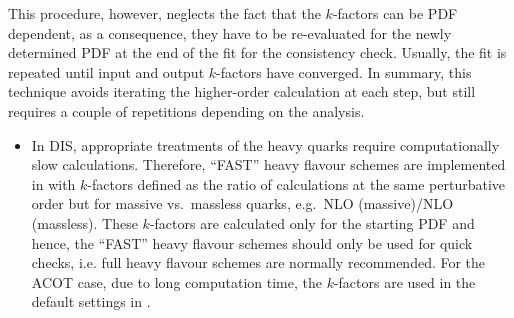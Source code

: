   This procedure, however, neglects the fact that the $k$-factors can be 
  PDF dependent, 
  as a consequence, they have to be re-evaluated
  for the newly determined PDF at the end of the fit for the consistency
  check. Usually, the fit is repeated until input and output
  $k$-factors have converged. In summary, this technique avoids
  iterating the higher-order calculation at each step, but still
  requires a couple of repetitions depending on the analysis.


\begin{itemize}
%
  \item In DIS, appropriate treatments of the heavy quarks require  
    computationally slow calculations.
    Therefore, ``FAST'' heavy flavour schemes are implemented
    in \fitter with $k$-factors defined as the ratio of
    calculations at the same perturbative order but for massive vs.\
    massless quarks, e.g.\ NLO (massive)/NLO (massless).
    These $k$-factors are calculated only for the
    starting PDF and hence, the ``FAST'' heavy flavour schemes should
    only be used for quick checks, i.e. full heavy flavour schemes
    are normally recommended. For the ACOT case,
    due to long computation time, the $k$-factors are used in 
    the default settings in \fitter. 




\end{itemize}
